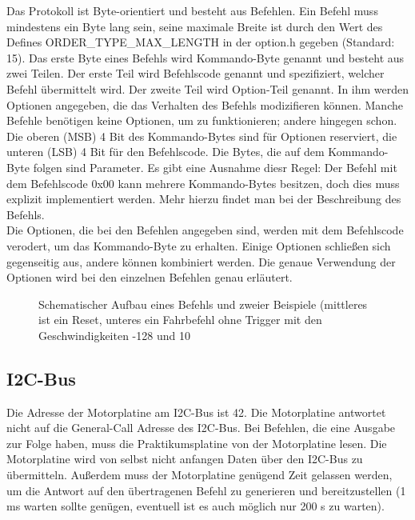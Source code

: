 \documentclass[a4paper]{article}
\begin{document}
	Das Protokoll ist Byte-orientiert und besteht aus Befehlen.
	Ein Befehl muss mindestens ein Byte lang sein, seine
	maximale Breite ist durch den Wert des Defines
	ORDER\_TYPE\_MAX\_LENGTH in der option.h gegeben (Standard: 15).
	Das erste Byte eines Befehls wird Kommando-Byte genannt und
	besteht aus zwei Teilen. Der erste Teil wird Befehlscode
	genannt und spezifiziert, welcher Befehl übermittelt wird.
	Der zweite Teil wird Option-Teil genannt. In ihm werden
	Optionen angegeben, die das Verhalten des Befehls modizifieren
	können. Manche Befehle benötigen keine Optionen, um zu
	funktionieren; andere hingegen schon. Die oberen (MSB) 4 Bit
	des Kommando-Bytes sind für Optionen reserviert, die unteren
	(LSB) 4 Bit für den Befehlscode. Die Bytes, die auf dem
	Kommando-Byte folgen sind Parameter. Es gibt eine Ausnahme
	diesr Regel: Der Befehl mit dem Befehlscode 0x00 kann mehrere
	Kommando-Bytes besitzen, doch dies muss explizit implementiert
	werden. Mehr hierzu findet man bei der Beschreibung des Befehls.
	\\
	Die Optionen, die bei den Befehlen angegeben sind, werden mit
	dem Befehlscode verodert, um das Kommando-Byte zu erhalten.
	Einige Optionen schließen sich gegenseitig aus, andere können
	kombiniert werden. Die genaue Verwendung der Optionen wird
	bei den einzelnen Befehlen genau erläutert.
	\\
	\begin{figure}[!ht]
		\centering
		\caption{Schematischer Aufbau eines Befehls und zweier Beispiele (mittleres ist ein Reset, unteres ein Fahrbefehl ohne
		Trigger mit den Geschwindigkeiten -128 und 10}
	\end{figure}
	
	\subsection{I2C-Bus}
	
	Die Adresse der Motorplatine am I2C-Bus ist 42. Die Motorplatine
	antwortet nicht auf die General-Call Adresse des I2C-Bus. Bei
	Befehlen, die eine Ausgabe zur Folge haben, muss die Praktikumsplatine
	von der Motorplatine lesen. Die Motorplatine wird von selbst nicht
	anfangen Daten über den I2C-Bus zu übermitteln. Außerdem muss der
	Motorplatine genügend Zeit gelassen werden, um die Antwort auf
	den übertragenen Befehl zu generieren und bereitzustellen (1 ms warten
	sollte genügen, eventuell ist es auch möglich nur 200 \textmu{}s zu
	warten).
	
\end{document}
